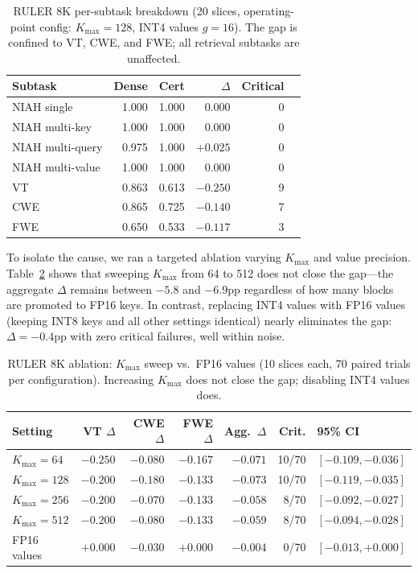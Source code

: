 \documentclass[10pt,twocolumn,a4paper]{article}
\theoremstyle{definition}
\theoremstyle{remark}
\begin{document}
\begin{table}[!t]
\centering
\caption{RULER 8K per-subtask breakdown (20 slices, operating-point config: $K_{\max}{=}128$, INT4 values $g{=}16$).  The gap is confined to VT, CWE, and FWE; all retrieval subtasks are unaffected.}
\label{tab:ruler_8k_subtask}
\small
\begin{tabular}{lrrrrr}
\toprule
\textbf{Subtask} & \textbf{Dense} & \textbf{Cert} & \textbf{$\Delta$} & \textbf{Critical} \\
\midrule
NIAH single      & 1.000 & 1.000 & $0.000$  & 0 \\
NIAH multi-key   & 1.000 & 1.000 & $0.000$  & 0 \\
NIAH multi-query & 0.975 & 1.000 & $+0.025$ & 0 \\
NIAH multi-value & 1.000 & 1.000 & $0.000$  & 0 \\
VT               & 0.863 & 0.613 & $-0.250$ & 9 \\
CWE              & 0.865 & 0.725 & $-0.140$ & 7 \\
FWE              & 0.650 & 0.533 & $-0.117$ & 3 \\
\bottomrule
\end{tabular}
\end{table}

To isolate the cause, we ran a targeted ablation varying $K_{\max}$ and value precision.  Table~\ref{tab:ruler_8k_ablation} shows that sweeping $K_{\max}$ from 64 to 512 does not close the gap---the aggregate $\Delta$ remains between $-5.8$ and $-6.9$pp regardless of how many blocks are promoted to FP16 keys.  In contrast, replacing INT4 values with FP16 values (keeping INT8 keys and all other settings identical) nearly eliminates the gap: $\Delta{=}{-}0.4$pp with zero critical failures, well within noise.

\begin{table}[!t]
\centering
\caption{RULER 8K ablation: $K_{\max}$ sweep vs.\ FP16 values (10 slices each, 70 paired trials per configuration).  Increasing $K_{\max}$ does not close the gap; disabling INT4 values does.}
\label{tab:ruler_8k_ablation}
\small
\begin{tabular}{lrrrrrl}
\toprule
\textbf{Setting} & \textbf{VT $\Delta$} & \textbf{CWE $\Delta$} & \textbf{FWE $\Delta$} & \textbf{Agg.\ $\Delta$} & \textbf{Crit.} & \textbf{95\% CI} \\
\midrule
$K_{\max}{=}64$   & $-0.250$ & $-0.080$ & $-0.167$ & $-0.071$ & 10/70 & $[-0.109, -0.036]$ \\
$K_{\max}{=}128$  & $-0.200$ & $-0.180$ & $-0.133$ & $-0.073$ & 10/70 & $[-0.119, -0.035]$ \\
$K_{\max}{=}256$  & $-0.200$ & $-0.070$ & $-0.133$ & $-0.058$ & 8/70  & $[-0.092, -0.027]$ \\
$K_{\max}{=}512$  & $-0.200$ & $-0.080$ & $-0.133$ & $-0.059$ & 8/70  & $[-0.094, -0.028]$ \\
\midrule
FP16 values       & $+0.000$ & $-0.030$ & $+0.000$ & $-0.004$ & 0/70  & $[-0.013, +0.000]$ \\
\bottomrule
\end{tabular}
\end{table}
\end{document}
